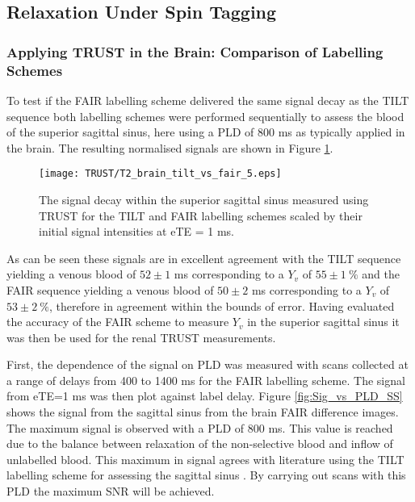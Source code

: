 \subsection{\ttwo Relaxation Under Spin Tagging}
\subsubsection{Applying \ac{TRUST} in the Brain: Comparison of Labelling Schemes}

To test if the \ac{FAIR} labelling scheme delivered the same signal decay as the \ac{TILT} sequence both labelling schemes were performed sequentially to assess the blood \ttwo of the superior sagittal sinus, here using a \ac{PLD} of 800 ms as typically applied in the brain. The resulting normalised signals are shown in Figure \ref{fig:TILT_vs_FAIR}.
\begin{figure}[H]
	\centering
	\texttt{[image: TRUST/T2\_brain\_tilt\_vs\_fair\_5.eps]}
	\caption{The signal decay within the superior sagittal sinus measured using \ac{TRUST} for the \ac{TILT} and \ac{FAIR} labelling schemes scaled by their initial signal intensities at eTE = 1 ms.}
	\label{fig:TILT_vs_FAIR}	
\end{figure}

As can be seen these signals are in excellent agreement with the \ac{TILT} sequence yielding a venous blood \ttwo of $52\pm1$ ms corresponding to a $Y_v$ of $55\pm1~\%$ and the \ac{FAIR} sequence yielding a venous blood \ttwo of $50\pm2$ ms corresponding to a $Y_v$ of $53\pm2~\%$, therefore in agreement within the bounds of error. Having evaluated the accuracy of the \ac{FAIR} scheme to measure $Y_v$ in the superior sagittal sinus it was then be used for the renal \ac{TRUST} measurements.

First, the dependence of the signal on \ac{PLD} was measured with scans collected at a range of delays from 400 to 1400 ms for the \ac{FAIR} labelling scheme. The signal from \ac{eTE}=1 ms was then plot against label delay. Figure \ref{fig:Sig_vs_PLD_SS} shows the signal from the sagittal sinus from the brain \ac{FAIR} difference images. The maximum signal is observed with a \ac{PLD} of 800 ms. This value is reached due to the balance between \tone relaxation of the non-selective blood and inflow of unlabelled blood. This maximum in signal agrees with literature using the \ac{TILT} labelling scheme for assessing the sagittal sinus \cite{lu_quantitative_2008}. By carrying out scans with this \ac{PLD} the maximum \ac{SNR} will be achieved. 

